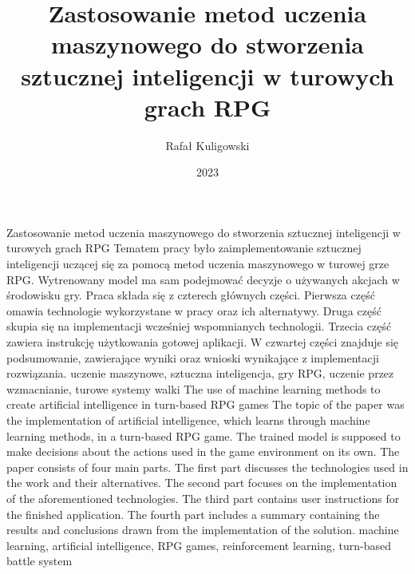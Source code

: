 \documentclass{SGGW-thesis}
\title{Zastosowanie metod uczenia maszynowego do stworzenia sztucznej inteligencji w turowych grach RPG}
\author{Rafał Kuligowski}
\date{2023}
\begin{document}
\makeatletter
\g@addto@macro{\UrlBreaks}{%
\do\/\do\a\do\b\do\c\do\d\do\e\do\f%
\do\g\do\h\do\i\do\j\do\k\do\l\do\m%
\do\n\do\o\do\p\do\q\do\r\do\s\do\t%
\do\u\do\v\do\w\do\x\do\y\do\z%
\do\A\do\B\do\C\do\D\do\E\do\F\do\G%
\do\H\do\I\do\J\do\K\do\L\do\M\do\N%
\do\O\do\P\do\Q\do\R\do\S\do\T\do\U%
\do\V\do\W\do\X\do\Y\do\Z}
\makeatother

\maketitle
\statementpage
\abstractpage
{Zastosowanie metod uczenia maszynowego do stworzenia sztucznej inteligencji w turowych grach RPG}
{Tematem pracy było zaimplementowanie sztucznej inteligencji uczącej się za pomocą metod uczenia maszynowego w turowej grze RPG. 
Wytrenowany model ma sam podejmować decyzje o używanych akcjach w środowisku gry. Praca składa się z czterech głównych części.
Pierwsza część omawia technologie wykorzystane w pracy oraz ich alternatywy. Druga część skupia się na implementacji wcześniej wspomnianych technologii.
Trzecia część zawiera instrukcję użytkowania gotowej aplikacji. W czwartej części znajduje się podsumowanie, zawierające wyniki oraz wnioski wynikające z implementacji rozwiązania.}
{uczenie maszynowe, sztuczna inteligencja, gry RPG, uczenie przez wzmacnianie, turowe systemy walki}
{The use of machine learning methods to create artificial intelligence in turn-based RPG games}
{The topic of the paper was the implementation of artificial intelligence, which learns through machine learning methods, in a turn-based RPG game.
The trained model is supposed to make decisions about the actions used in the game environment on its own.
The paper consists of four main parts. The first part discusses the technologies used in the work and their alternatives. The second part focuses on 
the implementation of the aforementioned technologies. The third part contains user instructions for the finished application. The fourth part includes 
a summary containing the results and conclusions drawn from the implementation of the solution.}
{machine learning, artificial intelligence, RPG games, reinforcement learning, turn-based battle system}


{
  \doublespacing
  \tableofcontents
}

\startchapterfromoddpage %
\end{document}
